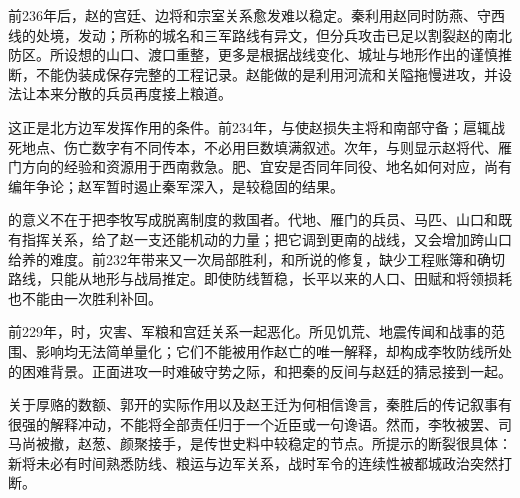 前236年后，赵的宫廷、边将和宗室关系愈发难以稳定。秦利用赵同时防燕、守西线的处境，发动；所称的城名和三军路线有异文，但分兵攻击已足以割裂赵的南北防区。所设想的山口、渡口重整，更多是根据战线变化、城址与地形作出的谨慎推断，不能伪装成保存完整的工程记录。赵能做的是利用河流和关隘拖慢进攻，并设法让本来分散的兵员再度接上粮道。

这正是北方边军发挥作用的条件。前234年，与使赵损失主将和南部守备；扈辄战死地点、伤亡数字有不同传本，不必用巨数填满叙述。次年，与则显示赵将代、雁门方向的经验和资源用于西南救急。肥、宜安是否同年同役、地名如何对应，尚有编年争论；赵军暂时遏止秦军深入，是较稳固的结果。

的意义不在于把李牧写成脱离制度的救国者。代地、雁门的兵员、马匹、山口和既有指挥关系，给了赵一支还能机动的力量；把它调到更南的战线，又会增加跨山口给养的难度。前232年带来又一次局部胜利，和所说的修复，缺少工程账簿和确切路线，只能从地形与战局推定。即使防线暂稳，长平以来的人口、田赋和将领损耗也不能由一次胜利补回。

前229年，时，灾害、军粮和宫廷关系一起恶化。所见饥荒、地震传闻和战事的范围、影响均无法简单量化；它们不能被用作赵亡的唯一解释，却构成李牧防线所处的困难背景。正面进攻一时难破守势之际，和把秦的反间与赵廷的猜忌接到一起。

关于厚赂的数额、郭开的实际作用以及赵王迁为何相信谗言，秦胜后的传记叙事有很强的解释冲动，不能将全部责任归于一个近臣或一句谗语。然而，李牧被罢、司马尚被撤，赵葱、颜聚接手，是传世史料中较稳定的节点。所提示的断裂很具体：新将未必有时间熟悉防线、粮运与边军关系，战时军令的连续性被都城政治突然打断。

